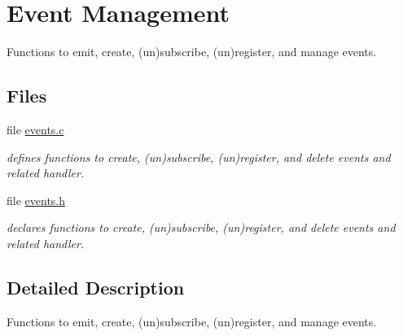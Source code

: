 \hypertarget{group__events}{}\section{Event Management}
\label{group__events}


Functions to emit, create, (un)subscribe, (un)register, and manage events.  


\subsection*{Files}
\begin{DoxyCompactItemize}
\item 
file \hyperlink{events_8c}{events.\+c}
\begin{DoxyCompactList}\small\item\em defines functions to create, (un)subscribe, (un)register, and delete events and related handler. \end{DoxyCompactList}\item 
file \hyperlink{events_8h}{events.\+h}
\begin{DoxyCompactList}\small\item\em declares functions to create, (un)subscribe, (un)register, and delete events and related handler. \end{DoxyCompactList}\end{DoxyCompactItemize}


\subsection{Detailed Description}
Functions to emit, create, (un)subscribe, (un)register, and manage events. 

